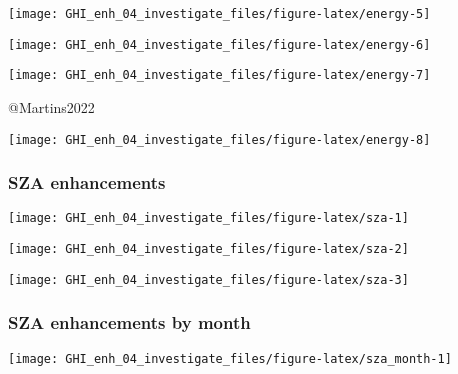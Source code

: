 \documentclass[
  10pt,
  a4paper,oneside]{article}
\begin{document}
\begin{center}\texttt{[image: GHI\_enh\_04\_investigate\_files/figure-latex/energy-5]} \end{center}

\begin{center}\texttt{[image: GHI\_enh\_04\_investigate\_files/figure-latex/energy-6]} \end{center}

\begin{center}\texttt{[image: GHI\_enh\_04\_investigate\_files/figure-latex/energy-7]} \end{center}

@Martins2022

\begin{center}\texttt{[image: GHI\_enh\_04\_investigate\_files/figure-latex/energy-8]} \end{center}

\newpage
\FloatBarrier

\hypertarget{sza-enhancements}{%
\subsubsection{SZA enhancements}\label{sza-enhancements}}

\begin{center}\texttt{[image: GHI\_enh\_04\_investigate\_files/figure-latex/sza-1]} \end{center}

\begin{center}\texttt{[image: GHI\_enh\_04\_investigate\_files/figure-latex/sza-2]} \end{center}

\begin{center}\texttt{[image: GHI\_enh\_04\_investigate\_files/figure-latex/sza-3]} \end{center}

\newpage
\FloatBarrier

\hypertarget{sza-enhancements-by-month}{%
\subsubsection{SZA enhancements by month}\label{sza-enhancements-by-month}}

\begin{center}\texttt{[image: GHI\_enh\_04\_investigate\_files/figure-latex/sza\_month-1]} \end{center}
\end{document}
